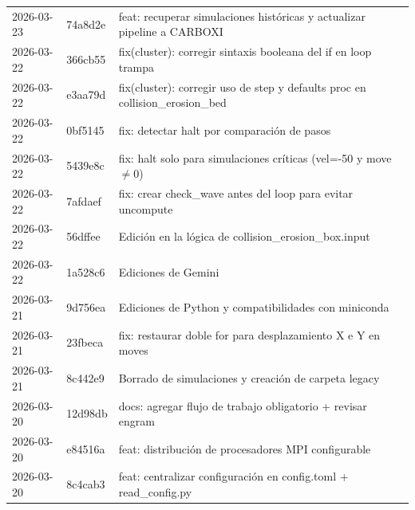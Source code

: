 \documentclass[12pt,a4paper]{article}
\begin{document}
\begin{longtable}{@{}llp{10cm}@{}}
	2026-03-23     & 74a8d2e         & feat: recuperar simulaciones históricas y actualizar pipeline a CARBOXI                                               \\
	2026-03-22     & 366cb55         & fix(cluster): corregir sintaxis booleana del if en loop trampa                                                        \\
	2026-03-22     & e3aa79d         & fix(cluster): corregir uso de step y defaults proc en collision\_erosion\_bed                                         \\
	2026-03-22     & 0bf5145         & fix: detectar halt por comparación de pasos                                                                           \\
	2026-03-22     & 5439e8c         & fix: halt solo para simulaciones críticas (vel=-50 y move$\neq$0)                                                     \\
	2026-03-22     & 7afdaef         & fix: crear check\_wave antes del loop para evitar uncompute                                                           \\
	2026-03-22     & 56dffee         & Edición en la lógica de collision\_erosion\_box.input                                                                 \\
	2026-03-22     & 1a528c6         & Ediciones de Gemini                                                                                                   \\
	2026-03-21     & 9d756ea         & Ediciones de Python y compatibilidades con miniconda                                                                  \\
	2026-03-21     & 23fbeca         & fix: restaurar doble for para desplazamiento X e Y en moves                                                           \\
	2026-03-21     & 8c442e9         & Borrado de simulaciones y creación de carpeta legacy                                                                  \\
	2026-03-20     & 12d98db         & docs: agregar flujo de trabajo obligatorio + revisar engram                                                           \\
	2026-03-20     & e84516a         & feat: distribución de procesadores MPI configurable                                                                   \\
	2026-03-20     & 8c4cab3         & feat: centralizar configuración en config.toml + read\_config.py                                                      \\

\end{longtable}
\end{document}
